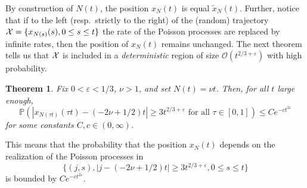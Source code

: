 \documentclass[12pt,a4paper]{article}
\numberwithin{equation}{section}
\newcommand{\Or}{\mathcal{O}}
\newcommand{\Pb}{\mathbb{P}}
\newcommand{\e}{\varepsilon}
\newtheorem{thm}[prop]{Theorem}
\begin{document}
By construction of $N(t)$, the position $x_N(t)$ is equal $\tilde x_N(t)$. Further, notice that if to the left (resp.\ strictly to the right) of the (random) trajectory ${\cal X}=\{x_{N(s)}(s),0\leq s\leq t\}$ the rate of the Poisson processes are replaced by infinite rates, then the position of $x_N(t)$ remains unchanged. The next theorem tells us that ${\cal X}$ is included in a \emph{deterministic} region of size $\Or(t^{2/3+\e})$ with high probability.
\begin{thm}\label{thmcorrelations}
Fix $0<\e<1/3$, $\nu>1$, and set $N(t)=\nu t$. Then, for all $t$ large enough,
\begin{equation}
\Pb\left(\left|x_{N(\tau t)}(\tau t)-(-2\nu+1/2)t\right|\geq 3 t^{2/3+\e}\textrm{ for all }\tau\in[0,1]\right)\leq C e^{-c t^{2\e}}
\end{equation}
for some constants $C,c\in (0,\infty)$.
\end{thm}
This means that the probability that the position $x_N(t)$ depends on the realization of the Poisson processes in
\begin{equation}
\{(j,s), |j-(-2\nu+1/2)t|\geq 3 t^{2/3+\e}, 0\leq s\leq t\}
\end{equation}
is bounded by $C e^{-c t^{2\e}}$.
\end{document}
